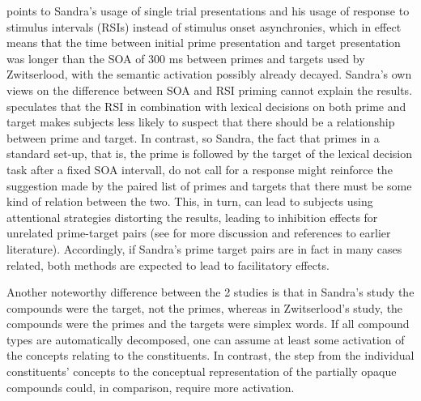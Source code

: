 \enlargethispage{1\baselineskip}
\citet[363]{Zwitserlood:1994} points to
Sandra's usage of single trial presentations and his usage of response
to stimulus intervals (RSIs) instead of stimulus onset asynchronies, which in effect
means that the time between initial prime presentation and target
presentation was longer than the SOA of 300 ms between primes and
targets used by Zwitserlood, with the semantic activation possibly
already decayed. Sandra's own views on the difference between SOA and
RSI priming cannot explain the results. \citet[534]{Sandra:1990}
speculates that the RSI in combination with lexical decisions on both prime and target makes subjects less likely to suspect that there
should be a relationship between prime and target. In contrast, so
Sandra, the fact that primes in a standard set-up, that is, the prime is
followed by the target of the lexical decision task after a fixed
SOA intervall, do not call for a response might
reinforce the suggestion made by the paired list of primes and targets
that there must be some kind of relation between the two. This, in
turn, can lead to subjects using attentional strategies distorting the
results, leading to inhibition effects for unrelated prime-target
pairs (see \citealt[534]{Sandra:1990} for more discussion and
references to earlier literature). Accordingly, if Sandra's prime
target pairs are in fact in many cases related, both methods are
expected to lead to facilitatory effects.

Another noteworthy difference between the 2 studies is that  in Sandra's study the compounds were the target, not the
primes, whereas in Zwitserlood's study, the compounds were the primes
and the targets were simplex words. If all compound types are
automatically decomposed, one can assume at least some activation of
the concepts relating to the constituents. In contrast, the step from
the individual constituents' concepts to the conceptual representation
of the partially opaque compounds
could, in comparison, require more activation. 
 

